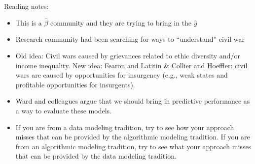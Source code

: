 \documentclass[aspectratio=169]{beamer}
\begin{document}
\begin{frame}

Reading notes:
\begin{itemize}
\item This is a $\hat{\beta}$ community and they are trying to bring in the $\hat{y}$
\pause
\item Research community had been searching for ways to ``understand'' civil war
\pause
\item Old idea: Civil wars caused by grievances related to ethic diversity and/or income inequality. \pause New idea: Fearon and Latitin \& Collier and Hoeffler: civil wars are caused by opportunities for insurgency (e.g., weak states and profitable opportunities for insurgents).
\pause
\item Ward and colleagues argue that we should bring in predictive performance as a way to evaluate these models. 
\pause
\item If you are from a data modeling tradition, try to see how your approach misses that can be provided by the algorithmic modeling tradition.  If you are from an algorithmic modeling tradition, try to see what your approach misses that can be provided by the data modeling tradition.
\end{itemize}

\end{frame}
\frame{\titlepage}
\end{document}
